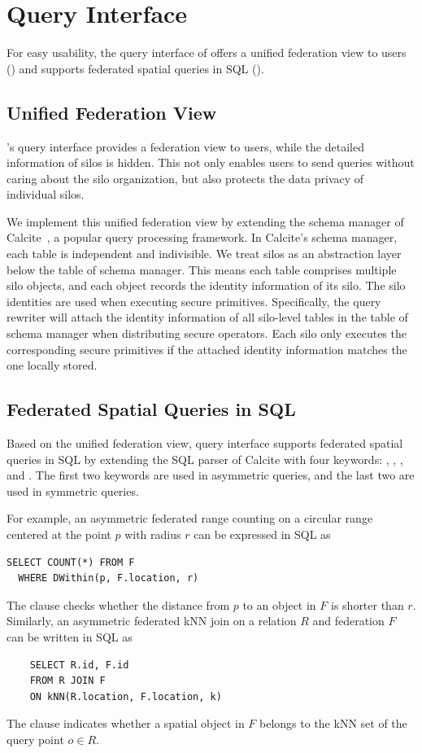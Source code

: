 \section{Query Interface}
\label{sec:interface}

For easy usability, the query interface of \sysname offers a unified federation view to users () and supports federated spatial queries in SQL ().

\subsection{Unified Federation View}
\label{sec:interface-view}
\sysname's query interface provides a federation view to users, while the detailed information of silos is hidden. 
This not only enables users to send queries without caring about the silo organization, but also protects the data privacy of individual silos.

We implement this unified federation view by extending the schema manager of Calcite~\cite{DBLP:conf/sigmod/BegoliCHML18}, a popular query processing framework.
In Calcite's schema manager, each table is independent and indivisible.
We treat silos as an abstraction layer below the table of schema manager.
This means each table comprises multiple silo objects, and each object records the identity information of its silo.
The silo identities are used when executing secure primitives. 
Specifically, the query rewriter will attach the identity information of all silo-level tables in the table of schema manager when distributing secure operators.
Each silo only executes the corresponding secure primitives if the attached identity information matches the one locally stored.

\subsection{Federated Spatial Queries in SQL}
\label{sec:interface-SQL}
Based on the unified federation view, \sysname query interface supports federated spatial queries in SQL by extending the SQL parser of Calcite with four keywords: {}, {},
{}, and {}.
The first two keywords are used in asymmetric queries, and the last two are used in symmetric queries.

For example, an asymmetric federated range counting on a circular range centered at the point $p$ with radius $r$ can be expressed in SQL as
\begin{lstlisting}[xleftmargin=1.0ex]
  SELECT COUNT(*) FROM F 
  WHERE DWithin(p, F.location, r)
\end{lstlisting}
The { clause checks} whether the distance from $p$ to an object in $F$ is shorter than $r$.
Similarly, an asymmetric federated kNN join on a relation $R$ and federation $F$ can be written in SQL as
\begin{lstlisting}
    SELECT R.id, F.id 
    FROM R JOIN F
    ON kNN(R.location, F.location, k)
\end{lstlisting}
The {} clause indicates whether a spatial object in $F$ belongs to the kNN set of the query point $o\in R$. 

